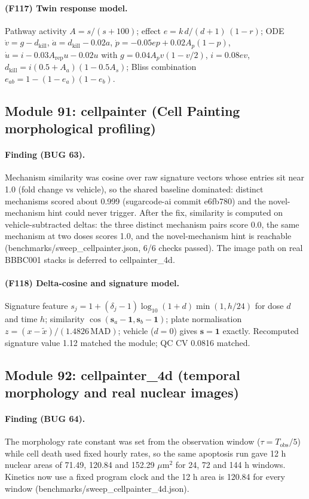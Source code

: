 \paragraph{(F117) Twin response model.} Pathway activity $A=s/(s+100)$; effect $e=k\,d/(d+1)\,(1-r)$; ODE $\dot v=g-d_{\mathrm{kill}}$, $\dot a=d_{\mathrm{kill}}-0.02a$, $\dot p=-0.05ep+0.02A_p(1-p)$, $\dot u=i-0.03A_{\mathrm{rep}}u-0.02u$ with $g=0.04A_pv(1-v/2)$, $i=0.08ev$, $d_{\mathrm{kill}}=i(0.5+A_a)(1-0.5A_s)$; Bliss combination $e_{ab}=1-(1-e_a)(1-e_b)$.
\subsection{Module 91: cellpainter (Cell Painting morphological profiling)}
\paragraph{Finding (BUG 63).} Mechanism similarity was cosine over raw signature vectors whose entries sit near 1.0 (fold change vs vehicle), so the shared baseline dominated: distinct mechanisms scored about 0.999 (sugarcode-ai commit e6fb780) and the novel-mechanism hint could never trigger. After the fix, similarity is computed on vehicle-subtracted deltas: the three distinct mechanism pairs score 0.0, the same mechanism at two doses scores 1.0, and the novel-mechanism hint is reachable (benchmarks/sweep\_cellpainter.json, 6/6 checks passed). The image path on real BBBC001 stacks is deferred to cellpainter\_4d.
\paragraph{(F118) Delta-cosine and signature model.} Signature feature $s_j=1+(\delta_j-1)\log_{10}(1+d)\min(1,h/24)$ for dose $d$ and time $h$; similarity $\cos(\mathbf{s}_a-\mathbf{1},\mathbf{s}_b-\mathbf{1})$; plate normalisation $z=(x-\tilde{x})/(1.4826\,\mathrm{MAD})$; vehicle ($d=0$) gives $\mathbf{s}=\mathbf{1}$ exactly. Recomputed signature value 1.12 matched the module; QC CV 0.0816 matched.
\subsection{Module 92: cellpainter\_4d (temporal morphology and real nuclear images)}
\paragraph{Finding (BUG 64).} The morphology rate constant was set from the observation window ($\tau=T_{\mathrm{obs}}/5$) while cell death used fixed hourly rates, so the same apoptosis run gave 12 h nuclear areas of 71.49, 120.84 and 152.29 $\mu\mathrm{m}^2$ for 24, 72 and 144 h windows. Kinetics now use a fixed program clock and the 12 h area is 120.84 for every window (benchmarks/sweep\_cellpainter\_4d.json).
